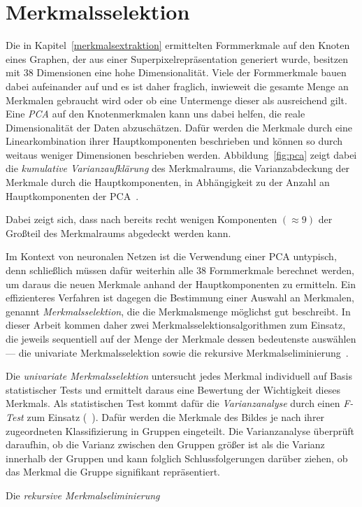 \section{Merkmalsselektion}
\label{merkmalsselektion}

Die in Kapitel~\ref{merkmalsextraktion} ermittelten Formmerkmale auf den Knoten eines Graphen, der aus einer Superpixelrepräsentation generiert wurde, besitzen mit $38$ Dimensionen eine hohe Dimensionalität.
Viele der Formmerkmale bauen dabei aufeinander auf und es ist daher fraglich, inwieweit die gesamte Menge an Merkmalen gebraucht wird oder ob eine Untermenge dieser als ausreichend gilt.
Eine \emph{\gls{PCA}} auf den Knotenmerkmalen kann uns dabei helfen, die reale Dimensionalität der Daten abzuschätzen.
Dafür werden die Merkmale durch eine Linearkombination ihrer Hauptkomponenten beschrieben und können so durch weitaus weniger Dimensionen beschrieben werden.
Abbildung~\ref{fig:pca} zeigt dabei die \emph{kumulative Varianzaufklärung} des Merkmalraums, \dhe{} die Varianzabdeckung der Merkmale durch die Hauptkomponenten, in Abhängigkeit zu der Anzahl an Hauptkomponenten der \gls{PCA}~\cite{scikitlearn}.

Dabei zeigt sich, dass nach bereits recht wenigen Komponenten $\left(\approx 9\right)$ der Großteil des Merkmalraums abgedeckt werden kann.

Im Kontext von neuronalen Netzen ist die Verwendung einer \gls{PCA} untypisch, denn schließlich müssen dafür weiterhin alle $38$ Formmerkmale berechnet werden, um daraus die neuen Merkmale anhand der Hauptkomponenten zu ermitteln.
Ein effizienteres Verfahren ist dagegen die Bestimmung einer Auswahl an Merkmalen, genannt \emph{Merkmalsselektion}, die die Merkmalsmenge möglichst gut beschreibt.
In dieser Arbeit kommen daher zwei Merkmalsselektionsalgorithmen zum Einsatz, die jeweils sequentiell auf der Menge der Merkmale dessen bedeutenste auswählen — die univariate Merkmalsselektion sowie die rekursive Merkmalseliminierung~\cite{scikitlearn}.

Die \emph{univariate Merkmalsselektion} untersucht jedes Merkmal individuell auf Basis statistischer Tests und ermittelt daraus eine Bewertung der Wichtigkeit dieses Merkmals.
Als statistischen Test kommt dafür die \emph{Varianzanalyse} durch einen \emph{F-Test} zum Einsatz (\vgl{}~\cite{scikitlearn}).
Dafür werden die Merkmale des Bildes je nach ihrer zugeordneten Klassifizierung in Gruppen eingeteilt.
Die Varianzanalyse überprüft daraufhin, ob die Varianz zwischen den Gruppen größer ist als die Varianz innerhalb der Gruppen und kann folglich Schlussfolgerungen darüber ziehen, ob das Merkmal die Gruppe signifikant repräsentiert.

Die \emph{rekursive Merkmalseliminierung}
